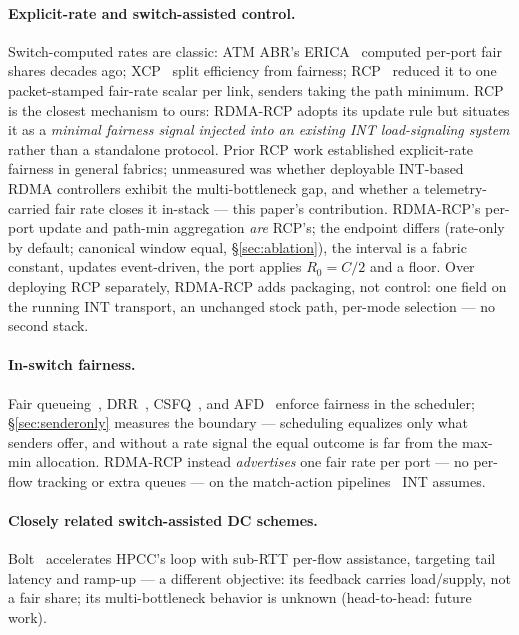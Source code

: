 \documentclass[sigconf, nonacm]{acmart}
\newcommand{\hpccfs}{\textsc{RDMA-RCP}\xspace}
\begin{document}
\paragraph{Explicit-rate and switch-assisted control.} Switch-computed rates are classic:
ATM ABR's ERICA~\cite{kalyanaraman2000erica} computed per-port fair shares decades ago;
XCP~\cite{katabi2002xcp} split efficiency from fairness; RCP~\cite{dukkipati2008rcp} reduced
it to one packet-stamped fair-rate scalar per link, senders taking the path minimum.
RCP is the closest mechanism to ours: \hpccfs adopts its update rule but situates it as a
\emph{minimal fairness signal injected into an existing INT load-signaling system} rather
than a standalone protocol. Prior RCP work established explicit-rate fairness in general
fabrics; unmeasured was whether deployable INT-based RDMA controllers exhibit the
multi-bottleneck gap, and whether a telemetry-carried fair rate closes it in-stack --- this
paper's contribution. \hpccfs's per-port update and path-min aggregation \emph{are} RCP's; the endpoint differs
(rate-only by default; canonical window equal, \S\ref{sec:ablation}), the interval is a
fabric constant, updates event-driven, the port applies $R_0 = C/2$ and a floor. Over deploying RCP separately, \hpccfs adds packaging, not control: one field on the
running INT transport, an unchanged stock path, per-mode selection --- no second stack.

\paragraph{In-switch fairness.} Fair queueing~\cite{demers1989fq}, DRR~\cite{shreedhar1995drr},
CSFQ~\cite{stoica1998csfq}, and AFD~\cite{pan2003afd} enforce fairness in the scheduler;
\S\ref{sec:senderonly} measures the boundary --- scheduling equalizes only what senders
offer, and without a rate signal the equal outcome is far from the max-min allocation.
\hpccfs instead \emph{advertises} one fair rate per port --- no per-flow tracking or
extra queues --- on the match-action pipelines~\cite{bosshart2014p4} INT assumes.

\paragraph{Closely related switch-assisted DC schemes.} Bolt~\cite{arslan2023bolt} accelerates HPCC's loop
with sub-RTT per-flow assistance, targeting tail latency and ramp-up --- a different
objective: its feedback carries load/supply, not a fair share; its multi-bottleneck behavior
is unknown (head-to-head: future work).
\end{document}

